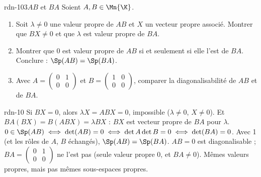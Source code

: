 \begin{exo}{rdn-10}{3}{$AB$ et $BA$}
Soient $A,B\in\Mn{\K}$.
\begin{enumerate}
\item Soit $\lambda\neq0$ une valeur propre de $AB$ et $X$ un vecteur propre associé. Montrer que $BX\neq0$ et que $\lambda$ est valeur
propre de $BA$.
\item Montrer que $0$ est valeur propre de $AB$ si et seulement si elle l'est de $BA$. Conclure : $\Sp(AB)=\Sp(BA)$.
\item Avec $A=\begin{pmatrix}0&1\\0&0\end{pmatrix}$ et $B=\begin{pmatrix}1&0\\0&0\end{pmatrix}$, comparer la diagonalisabilité de $AB$ et de $BA$.
\end{enumerate}
\end{exo}
\begin{corrige}{rdn-10}
 Si $BX=0$, alors $\lambda X=ABX=0$, impossible ($\lambda\neq0$, $X\neq0$). Et $BA(BX)=B(ABX)=\lambda BX$ : $BX$ est vecteur
propre de $BA$ pour $\lambda$.
 $0\in\Sp(AB)\iff\det(AB)=0\iff\det A\det B=0\iff\det(BA)=0$. Avec 1 (et les rôles de $A$, $B$ échangés), $\Sp(AB)=\Sp(BA)$.
 $AB=0$ est diagonalisable ; $BA=\begin{pmatrix}0&1\\0&0\end{pmatrix}$ ne l'est pas (seule valeur propre $0$, et $BA\neq0$).
Mêmes valeurs propres, mais pas mêmes sous-espaces propres.
\end{corrige}

